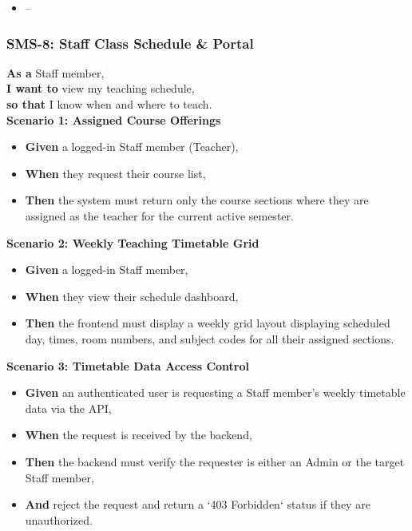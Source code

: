 \begin{itemize}
  \item --
\end{itemize}

\subsubsection{SMS-8: Staff Class Schedule \& Portal}
\noindent \textbf{As a} Staff member, \\
\noindent \textbf{I want to} view my teaching schedule, \\
\noindent \textbf{so that} I know when and where to teach. \\



\noindent\textbf{Scenario 1: Assigned Course Offerings}\\
\begin{itemize}
  \item \textbf{Given} a logged-in Staff member (Teacher),
  \item \textbf{When} they request their course list,
  \item \textbf{Then} the system must return only the course sections where they are assigned as the teacher for the current active semester.
\end{itemize}


\noindent\textbf{Scenario 2: Weekly Teaching Timetable Grid}\\
\begin{itemize}
  \item \textbf{Given} a logged-in Staff member,
  \item \textbf{When} they view their schedule dashboard,
  \item \textbf{Then} the frontend must display a weekly grid layout displaying scheduled day, times, room numbers, and subject codes for all their assigned sections.
\end{itemize}


\noindent\textbf{Scenario 3: Timetable Data Access Control}\\
\begin{itemize}
  \item \textbf{Given} an authenticated user is requesting a Staff member's weekly timetable data via the API,
  \item \textbf{When} the request is received by the backend,
  \item \textbf{Then} the backend must verify the requester is either an Admin or the target Staff member,
  \item \textbf{And} reject the request and return a `403 Forbidden` status if they are unauthorized.
\end{itemize}

